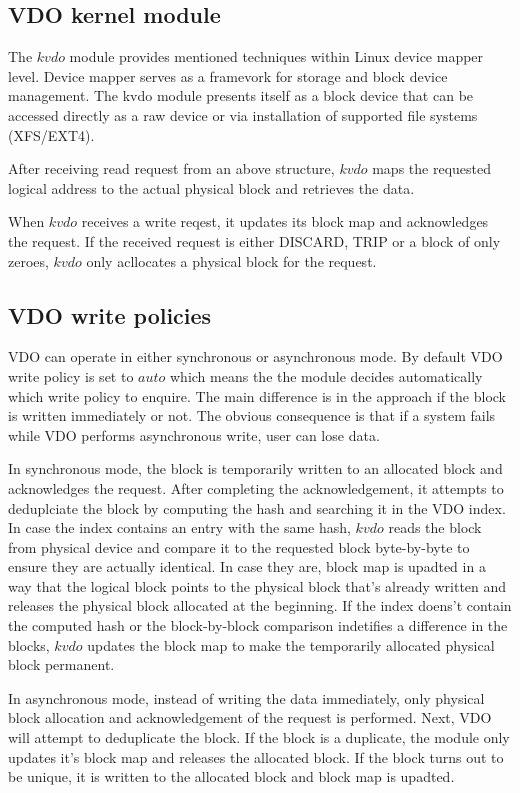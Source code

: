 \documentclass[
  color, %
  table, %
  lof,   %
  lot,   %
]{fithesis3}
\begin{document}
\subsection{VDO kernel module}
The $kvdo$ module provides mentioned techniques within Linux device mapper level. Device mapper serves as a framevork for storage and block device management. The kvdo module presents itself as a block device that can be accessed directly as a raw device or via installation of supported file systems (XFS/EXT4). 

After receiving read request from an above structure, $kvdo$ maps the requested logical address to the actual physical block and retrieves the data.

When $kvdo$ receives a write reqest, it updates its block map and acknowledges the request. If the received request is either DISCARD, TRIP or a block of only zeroes, $kvdo$ only acllocates a physical block for the request.

\subsection{VDO write policies}
VDO can operate in either synchronous or asynchronous mode. By default VDO write policy is set to $auto$ which means the the module decides automatically which write policy to enquire. The main difference is in the approach if the block is written immediately or not. The obvious consequence is that if a system fails while VDO performs asynchronous write, user can lose data.

In synchronous mode, the block is temporarily written to an allocated block and acknowledges the request. After completing the acknowledgement, it attempts to deduplciate the block by computing the hash and searching it in the VDO index. In case the index contains an entry with the same hash, $kvdo$ reads the block from physical device and compare it to the requested block byte-by-byte to ensure they are actually identical. In case they are, block map is upadted in a way that the logical block points to the physical block that's already written and releases the physical block allocated at the beginning. If the index doens't contain the computed hash or the block-by-block comparison indetifies a difference in the blocks, $kvdo$ updates the block map to make the temporarily allocated physical block permanent.

In asynchronous mode, instead of writing the data immediately, only physical block allocation and acknowledgement of the request is performed. Next, VDO will attempt to deduplicate the block. If the block is a duplicate, the module only updates it's block map and releases the allocated block. If the block turns out to be unique, it is written to the allocated block and block map is upadted.
\end{document}
